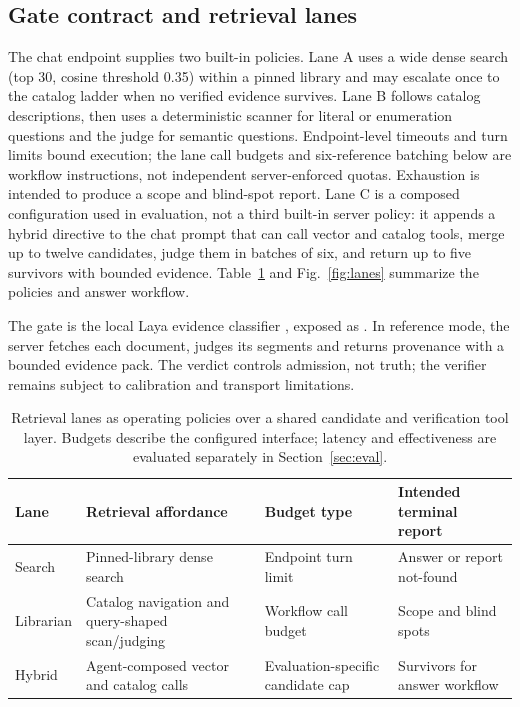 \subsection{Gate contract and retrieval lanes}
\label{sec:trace}
\label{sec:gate}
\label{sec:gate-primitive}
\label{sec:twostage}

The chat endpoint supplies two built-in policies. Lane A uses a wide dense search
(top 30, cosine threshold 0.35) within a pinned library and may escalate once
to the catalog ladder when no verified evidence survives. Lane B follows catalog descriptions, then
uses a deterministic scanner for literal or enumeration questions and the judge
for semantic questions. Endpoint-level timeouts and turn limits bound execution;
the lane call budgets and six-reference batching below are workflow instructions,
not independent server-enforced quotas. Exhaustion is intended to produce a
scope and blind-spot report. Lane C is a composed configuration used in
evaluation, not a third built-in server policy: it appends a hybrid directive
to the chat prompt that can call vector and catalog tools, merge up to twelve
candidates, judge them in batches of six, and return up to five survivors with
bounded evidence. Table~\ref{tab:lanes} and Fig.~\ref{fig:lanes} summarize the
policies and answer workflow.

The gate is the local Laya evidence classifier \cite{laya}, exposed as
. In reference mode, the server fetches each document,
judges its segments and returns provenance with a bounded evidence pack. The
verdict controls admission, not truth; the verifier remains subject to
calibration and transport limitations.

\begin{table}[t]
\centering
\small
\setlength{\tabcolsep}{5pt}
\caption{Retrieval lanes as operating policies over a shared candidate and verification tool layer. Budgets describe the configured interface; latency and effectiveness are evaluated separately in Section~\ref{sec:eval}.}
\label{tab:lanes}
\begin{tabular}{@{}llll@{}}
\toprule
Lane & Retrieval affordance & Budget type & Intended terminal report \\
\midrule
Search & Pinned-library dense search & Endpoint turn limit & Answer or report not-found \\
Librarian & Catalog navigation and query-shaped scan/judging & Workflow call budget & Scope and blind spots \\
Hybrid & Agent-composed vector and catalog calls & Evaluation-specific candidate cap & Survivors for answer workflow \\
\bottomrule
\end{tabular}
\end{table}

